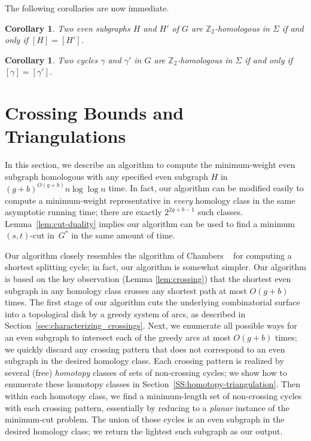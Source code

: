 \documentclass[11pt,twoside]{article}
\def\Z{\mathbb{Z}}
\def\cycle{\gamma}
\newtheorem{corollary}[theorem]{Corollary}
\begin{document}
The following corollaries are now immediate.

\begin{corollary}
Two even subgraphs $H$ and $H'$ of $G$ are $\Z_2$-homologous in $\Sigma$ if and only if $[H] = [H']$.
\end{corollary}

\begin{corollary}
Two cycles $\cycle$ and $\cycle'$ in $G$ are $\Z_2$-homologous in $\Sigma$ if and only if $[\cycle] = [\cycle']$.
\end{corollary}

\section{Crossing Bounds and Triangulations}
\label{sec:crossing}


In this section, we describe an
algorithm to compute the minimum-weight even subgraph homologous with any specified even subgraph 
$H$ in $(g+b)^{O(g+b)}n\log \log n$ time.  In fact, our algorithm can be
modified easily to compute a minimum-weight representative in
\emph{every} homology class in the same asymptotic running time;
there are exactly $2^{2g+b-1}$ such classes.
Lemma~\ref{lem:cut-duality} implies our algorithm can be used to find a minimum $(s,t)$-cut in~$G^*$ in the same amount of time.

Our algorithm closely resembles the algorithm of Chambers \etal~\cite{ccelw-scsih-08} for computing a shortest splitting cycle; in fact, our algorithm is somewhat simpler.  Our algorithm is based on the key observation (Lemma \ref{lem:crossing})  that the shortest even subgraph in any homology class crosses any shortest path at most $O(g+b)$ times.  The first stage of our algorithm cuts the underlying combinatorial surface into a topological disk by a greedy system of arcs, as described in Section~\ref{sec:characterizing_crossings}.  Next, we enumerate all possible ways for an even subgraph to intersect each of the greedy arcs at most $O(g+b)$ times; we quickly discard any crossing pattern that does not correspond to an even subgraph in the desired homology class.  Each crossing pattern is realized by several (free) \emph{homotopy} classes of sets of non-crossing cycles; we show how to enumerate these homotopy classes in Section~\ref{SS:homotopy-triangulation}.  Then within each homotopy class, we find a minimum-length set of non-crossing cycles with each crossing pattern, essentially by reducing to a \emph{planar} instance of the minimum-cut problem.  The union of those cycles is an even subgraph in the desired homology class; we return the lightest such subgraph as our output.
\end{document}

